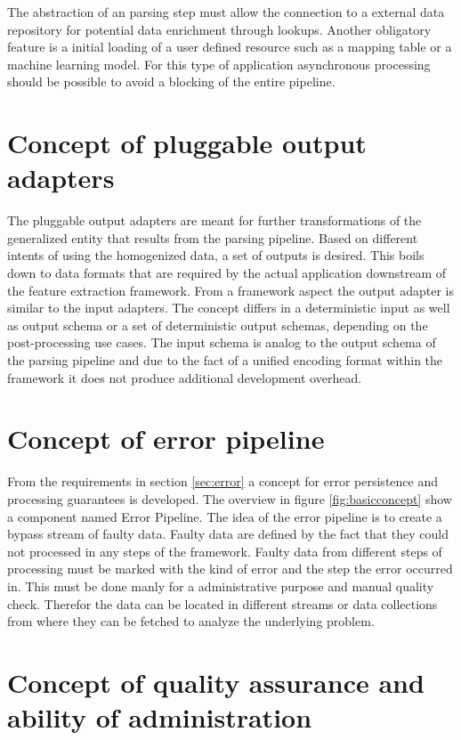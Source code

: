 The abstraction of an parsing step must allow the connection to a external data repository for potential data enrichment through lookups. Another obligatory feature is a initial loading of a user defined resource such as a mapping table or a machine learning model. For this type of application asynchronous processing should be possible to avoid a blocking of the entire pipeline.

\section{Concept of pluggable output adapters\label{sec:componentsoutput}}

The pluggable output adapters are meant for further transformations of the generalized entity that results from the parsing pipeline. Based on different intents of using the homogenized data, a set of outputs is desired. This boils down to data formats that are required by the actual application downstream of the feature extraction framework. From a framework aspect the output adapter is similar to the input adapters. The concept differs in a deterministic input as well as output schema or a set of deterministic output schemas, depending on the post-processing use cases. The input schema is analog to the output schema of the parsing pipeline and due to the fact of a unified encoding format within the framework it does not produce additional development overhead. 

\section{Concept of error pipeline \label{sec:errorpipeline}}

From the requirements in section \ref{sec:error} a concept for error persistence and processing guarantees is developed. The overview in figure \ref{fig:basicconcept} show a component named Error Pipeline. The idea of the error pipeline is to create a bypass stream of faulty data. Faulty data are defined by the fact that they could not processed in any steps of the framework. Faulty data from different steps of processing must be marked with the kind of error and the step the error occurred in. This must be done manly for a administrative purpose and manual quality check. Therefor the data can be located in different streams or data collections from where they can be fetched to analyze the underlying problem.

\section{Concept of quality assurance and ability of administration}

